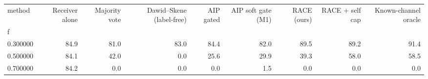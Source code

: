 \begin{tabular}{lrrrrrrrr}
\toprule
method & Receiver alone & Majority vote & Dawid–Skene (label-free) & AIP gated & AIP soft gate (M1) & RACE (ours) & RACE + self cap & Known-channel oracle \\
f &  &  &  &  &  &  &  &  \\
\midrule
0.300000 & 84.9 & 81.0 & 83.0 & 84.4 & 82.0 & 89.5 & 89.2 & 91.4 \\
0.500000 & 84.1 & 42.0 & 0.0 & 25.6 & 29.9 & 39.3 & 58.0 & 58.5 \\
0.700000 & 84.2 & 0.0 & 0.0 & 0.0 & 1.5 & 0.0 & 0.0 & 0.0 \\
\bottomrule
\end{tabular}
